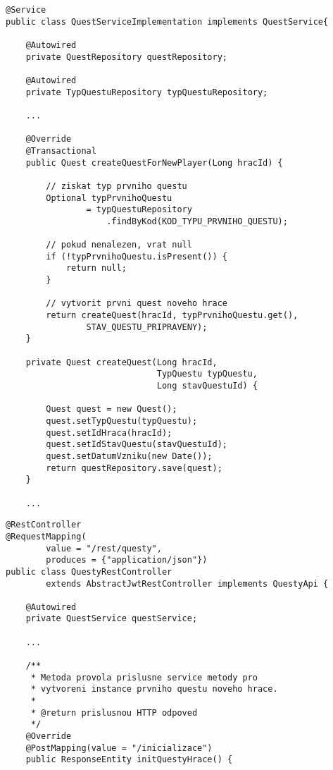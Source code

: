 \documentclass[twoside, 12pt]{article}
\begin{document}
{{\vspace{50}


\begin{lstlisting}
@Service
public class QuestServiceImplementation implements QuestService{

    @Autowired
    private QuestRepository questRepository;

    @Autowired
    private TypQuestuRepository typQuestuRepository;

    ...

    @Override
    @Transactional
    public Quest createQuestForNewPlayer(Long hracId) {

        // ziskat typ prvniho questu
        Optional typPrvnihoQuestu
                = typQuestuRepository
                    .findByKod(KOD_TYPU_PRVNIHO_QUESTU);

        // pokud nenalezen, vrat null
        if (!typPrvnihoQuestu.isPresent()) {
            return null;
        }

        // vytvorit prvni quest noveho hrace
        return createQuest(hracId, typPrvnihoQuestu.get(),
                STAV_QUESTU_PRIPRAVENY);
    }

    private Quest createQuest(Long hracId,
                              TypQuestu typQuestu,
                              Long stavQuestuId) {

        Quest quest = new Quest();
        quest.setTypQuestu(typQuestu);
        quest.setIdHraca(hracId);
        quest.setIdStavQuestu(stavQuestuId);
        quest.setDatumVzniku(new Date());
        return questRepository.save(quest);
    }

    ...

\end{lstlisting}

\clearpage


\begin{lstlisting}
@RestController
@RequestMapping(
        value = "/rest/questy",
        produces = {"application/json"})
public class QuestyRestController
        extends AbstractJwtRestController implements QuestyApi {

    @Autowired
    private QuestService questService;

    ...

    /**
     * Metoda provola prislusne service metody pro
     * vytvoreni instance prvniho questu noveho hrace.
     *
     * @return prislusnou HTTP odpoved
     */
    @Override
    @PostMapping(value = "/inicializace")
    public ResponseEntity initQuestyHrace() {


\end{lstlisting}}}
\end{document}
